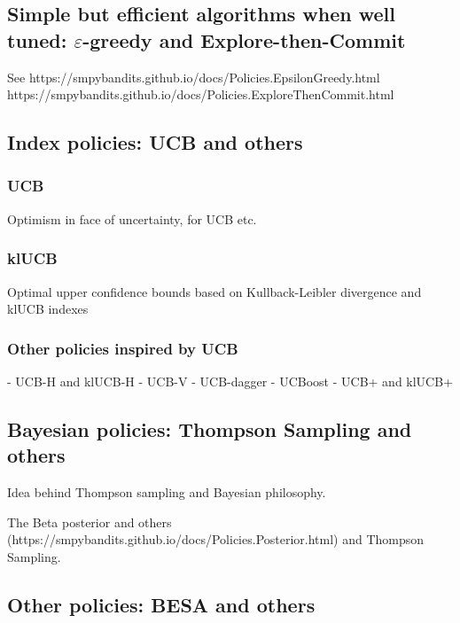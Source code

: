 \subsection{Simple but efficient algorithms when well tuned: $\varepsilon$-greedy and Explore-then-Commit}

See
https://smpybandits.github.io/docs/Policies.EpsilonGreedy.html
https://smpybandits.github.io/docs/Policies.ExploreThenCommit.html


\subsection{Index policies: UCB and others}

\subsubsection{UCB}
Optimism in face of uncertainty, for UCB etc.


\subsubsection{klUCB}
Optimal upper confidence bounds based on Kullback-Leibler divergence and klUCB indexes

\subsubsection{Other policies inspired by UCB}

- UCB-H and klUCB-H
- UCB-V
- UCB-dagger
- UCBoost
- UCB+ and klUCB+


\subsection{Bayesian policies: Thompson Sampling and others}

Idea behind Thompson sampling and Bayesian philosophy.

The Beta posterior and others (https://smpybandits.github.io/docs/Policies.Posterior.html) and Thompson Sampling.


\subsection{Other policies: BESA and others}

